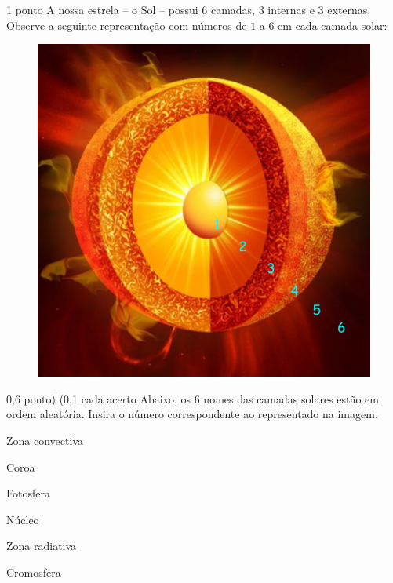 \documentclass{../lista}
\begin{document}

	\begin{questao}{1 ponto}
		A nossa estrela -- o Sol -- possui 6 camadas, 3 internas e 3 externas. Observe a seguinte representação com números de $1$ a $6$ em cada camada solar:
		\begin{figure}[H]
			\centering
			\includegraphics[scale=0.6]{./img/1.png}
		\end{figure}

		\begin{pergunta}{0,6 ponto) (0,1 cada acerto}
			Abaixo, os 6 nomes das camadas solares estão em ordem aleatória. Insira o número correspondente ao representado na imagem.
			\begin{multicols}{2} \begin{alternativas}
				\item Zona convectiva
				\item Coroa
				\item Fotosfera
				\item Núcleo
				\item Zona radiativa
				\item Cromosfera
			\end{alternativas} \end{multicols}
		\end{pergunta}


\end{questao}
\end{document}
